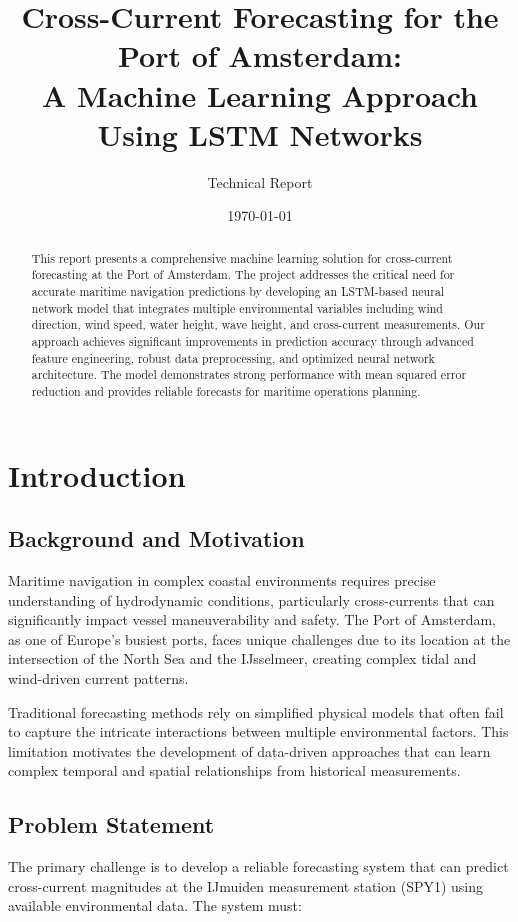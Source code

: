 \documentclass[12pt,a4paper]{article}
\title{Cross-Current Forecasting for the Port of Amsterdam: \\
A Machine Learning Approach Using LSTM Networks}
\author{Technical Report}
\date{\today}
\begin{document}
\maketitle

\begin{abstract}
This report presents a comprehensive machine learning solution for cross-current forecasting at the Port of Amsterdam. The project addresses the critical need for accurate maritime navigation predictions by developing an LSTM-based neural network model that integrates multiple environmental variables including wind direction, wind speed, water height, wave height, and cross-current measurements. Our approach achieves significant improvements in prediction accuracy through advanced feature engineering, robust data preprocessing, and optimized neural network architecture. The model demonstrates strong performance with mean squared error reduction and provides reliable forecasts for maritime operations planning.
\end{abstract}

\tableofcontents
\newpage

\section{Introduction}

\subsection{Background and Motivation}
Maritime navigation in complex coastal environments requires precise understanding of hydrodynamic conditions, particularly cross-currents that can significantly impact vessel maneuverability and safety. The Port of Amsterdam, as one of Europe's busiest ports, faces unique challenges due to its location at the intersection of the North Sea and the IJsselmeer, creating complex tidal and wind-driven current patterns.

Traditional forecasting methods rely on simplified physical models that often fail to capture the intricate interactions between multiple environmental factors. This limitation motivates the development of data-driven approaches that can learn complex temporal and spatial relationships from historical measurements.

\subsection{Problem Statement}
The primary challenge is to develop a reliable forecasting system that can predict cross-current magnitudes at the IJmuiden measurement station (SPY1) using available environmental data. The system must:
\end{document}
